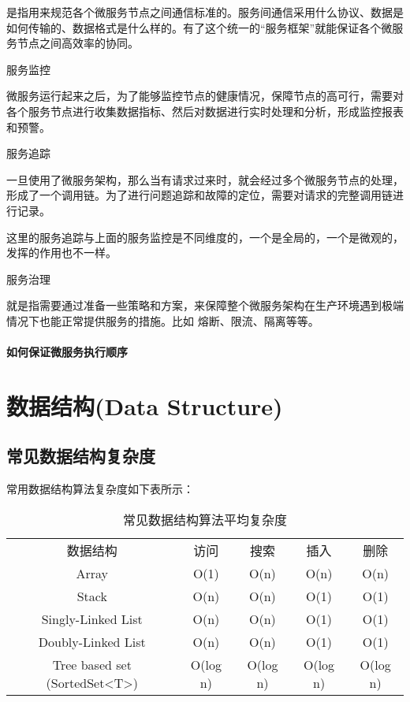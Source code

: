 \documentclass[../../../interview-questions.tex]{subfiles}
\begin{document}
是指用来规范各个微服务节点之间通信标准的。服务间通信采用什么协议、数据是如何传输的、数据格式是什么样的。有了这个统一的“服务框架”就能保证各个微服务节点之间高效率的协同。

服务监控

微服务运行起来之后，为了能够监控节点的健康情况，保障节点的高可行，需要对各个服务节点进行收集数据指标、然后对数据进行实时处理和分析，形成监控报表和预警。

服务追踪

一旦使用了微服务架构，那么当有请求过来时，就会经过多个微服务节点的处理，形成了一个调用链。为了进行问题追踪和故障的定位，需要对请求的完整调用链进行记录。

这里的服务追踪与上面的服务监控是不同维度的，一个是全局的，一个是微观的，发挥的作用也不一样。

服务治理

就是指需要通过准备一些策略和方案，来保障整个微服务架构在生产环境遇到极端情况下也能正常提供服务的措施。比如 熔断、限流、隔离等等。

\paragraph{如何保证微服务执行顺序}



\section{数据结构(Data Structure)}

\subsection{常见数据结构复杂度}

常用数据结构算法复杂度如下表所示：


\begin{table}[htbp]
	\caption{常见数据结构算法平均复杂度}
	\label{table:mapo3}
	\begin{center}
		\begin{tabular}{ccccc}
			\hline
			\multirow{1}{*}{数据结构}
			& \multicolumn{1}{c}{访问} 
			& \multicolumn{1}{c}{搜索}
			& \multicolumn{1}{c}{插入}
			& \multicolumn{1}{c}{删除}\\			
			\cline{1-5}
			Array &  O(1)  &  O(n) & O(n) & O(n)\\
			\hline
			Stack & O(n) & O(n) & O(1) & O(1) \\
			\hline
			Singly-Linked List &  O(n) & O(n) & O(1) & O(1) \\
			\hline	
			Doubly-Linked List & O(n) & O(n) & O(1) &  O(1)\\
			\hline
			Tree based set (SortedSet<T>) & O(log n) & O(log n) & O(log n) &  O(log n)\\
			\hline						
		\end{tabular}	
	\end{center}
\end{table}
\end{document}
